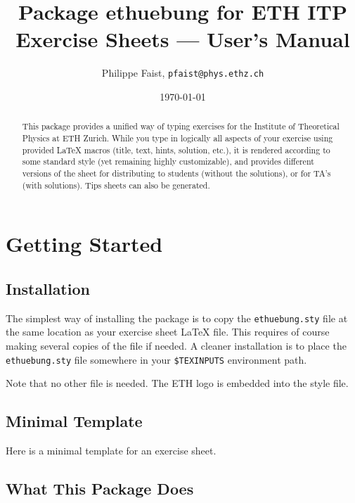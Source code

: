 \documentclass[11pt,a4paper]{article}
\title{Package {\fontseries{m}\selectfont ethuebung} for ETH ITP Exercise Sheets --- User's Manual}
\author{Philippe Faist, \texttt{pfaist{@}phys.ethz.ch}}
\date\today
\begin{document}
\maketitle

\renewcommand{\abstractname}{}
\renewcommand{\noteabstracttextfont}{\small}
\begin{abstract}
  This package provides a unified way of typing exercises for the Institute of Theoretical
  Physics at ETH Zurich. While you type in logically all aspects of your exercise using
  provided \LaTeX{} macros (title, text, hints, solution, etc.), it is rendered according
  to some standard style (yet remaining highly customizable), and provides different
  versions of the sheet for distributing to students (without the solutions), or for TA's
  (with solutions). Tips sheets can also be generated.
\end{abstract}

{\small
\inlinetoc
}

\section{Getting Started}

\subsection{Installation}

The simplest way of installing the \ethuebung{} package is to copy the
\texttt{ethuebung.sty} file at the same location as your exercise sheet \LaTeX{} file. This
requires of course making several copies of the file if needed.
A cleaner installation is to place the \texttt{ethuebung.sty} file somewhere in your
\texttt{\$TEXINPUTS} environment path.

Note that no other file is needed. The ETH logo is embedded into the style file.


\subsection{Minimal Template}
\label{sec:minimaltemplate}

Here is a minimal template for an exercise sheet.

\begin{pkgverbatim}%
%
\end{pkgverbatim}


\subsection{What This Package Does}
\end{document}
